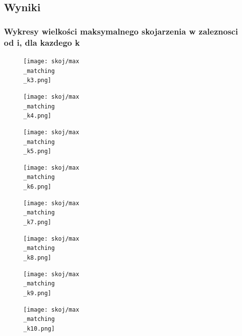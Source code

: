 \documentclass{article}
\begin{document}
\subsection*{Wyniki}
\subsubsection*{Wykresy wielkości maksymalnego skojarzenia w zaleznosci od i, dla kazdego k }
\begin{figure}[H]
\centering
\begin{minipage}{0.45\textwidth}
\centering
\texttt{[image: skoj/max\\\_matching\\\_k3.png]}
\end{minipage}
\hfill
\begin{minipage}{0.45\textwidth}
\centering
\texttt{[image: skoj/max\\\_matching\\\_k4.png]}
\end{minipage}
\end{figure}
\begin{figure}[H]
\centering
\begin{minipage}{0.45\textwidth}
\centering
\texttt{[image: skoj/max\\\_matching\\\_k5.png]}
\end{minipage}
\hfill
\begin{minipage}{0.45\textwidth}
\centering
\texttt{[image: skoj/max\\\_matching\\\_k6.png]}
\end{minipage}
\end{figure}
\begin{figure}[H]
\centering
\begin{minipage}{0.45\textwidth}
\centering
\texttt{[image: skoj/max\\\_matching\\\_k7.png]}
\end{minipage}
\hfill
\begin{minipage}{0.45\textwidth}
\centering
\texttt{[image: skoj/max\\\_matching\\\_k8.png]}
\end{minipage}
\end{figure}
\begin{figure}[H]
\centering
\begin{minipage}{0.45\textwidth}
\centering
\texttt{[image: skoj/max\\\_matching\\\_k9.png]}
\end{minipage}
\hfill
\begin{minipage}{0.45\textwidth}
\centering
\texttt{[image: skoj/max\\\_matching\\\_k10.png]}
\end{minipage}
\end{figure}
\end{document}

